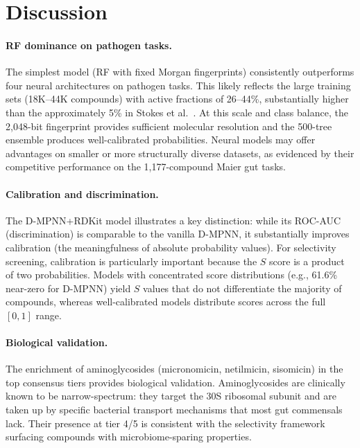 \documentclass{article}
\begin{document}
\section{Discussion}
\label{sec:discussion}

\paragraph{RF dominance on pathogen tasks.}
The simplest model (RF with fixed Morgan fingerprints) consistently outperforms four neural architectures on pathogen tasks.
This likely reflects the large training sets (18K--44K compounds) with active fractions of 26--44\%, substantially higher than the approximately 5\% in Stokes et al.~\citep{stokes2020}.
At this scale and class balance, the 2,048-bit fingerprint provides sufficient molecular resolution and the 500-tree ensemble produces well-calibrated probabilities.
Neural models may offer advantages on smaller or more structurally diverse datasets, as evidenced by their competitive performance on the 1,177-compound Maier gut tasks.

\paragraph{Calibration and discrimination.}
The D-MPNN+RDKit model illustrates a key distinction: while its ROC-AUC (discrimination) is comparable to the vanilla D-MPNN, it substantially improves calibration (the meaningfulness of absolute probability values).
For selectivity screening, calibration is particularly important because the $S$ score is a product of two probabilities.
Models with concentrated score distributions (e.g., 61.6\% near-zero for D-MPNN) yield $S$ values that do not differentiate the majority of compounds, whereas well-calibrated models distribute scores across the full $[0,1]$ range.

\paragraph{Biological validation.}
The enrichment of aminoglycosides (micronomicin, netilmicin, sisomicin) in the top consensus tiers provides biological validation.
Aminoglycosides are clinically known to be narrow-spectrum: they target the 30S ribosomal subunit and are taken up by specific bacterial transport mechanisms that most gut commensals lack.
Their presence at tier 4/5 is consistent with the selectivity framework surfacing compounds with microbiome-sparing properties.
\end{document}
